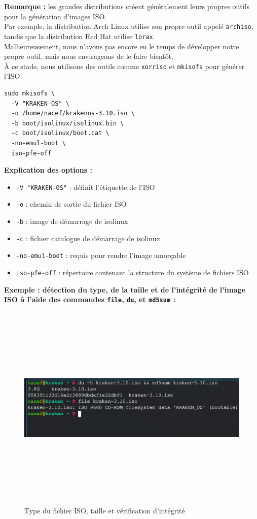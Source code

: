 \textbf{Remarque :} les grandes distributions créent généralement leurs propres outils pour la génération d'images ISO.\\
Par exemple, la distribution Arch Linux utilise son propre outil appelé \texttt{archiso}, tandis que la distribution Red Hat utilise \texttt{lorax}.\\
Malheureusement, nous n'avons pas encore eu le temps de développer notre propre outil, mais nous envisageons de le faire bientôt.\\
À ce stade, nous utilisons des outils comme \texttt{xorriso} et \texttt{mkisofs} pour générer l'ISO.
\begin{verbatim}
sudo mkisofs \
  -V "KRAKEN-OS" \
  -o /home/nacef/krakenos-3.10.iso \
  -b boot/isolinux/isolinux.bin \
  -c boot/isolinux/boot.cat \
  -no-emul-boot \
  iso-pfe-off
\end{verbatim}

\textbf{Explication des options :}
\begin{itemize}
  \item \texttt{-V "KRAKEN-OS"} : définit l'étiquette de l'ISO
  \item \texttt{-o} : chemin de sortie du fichier ISO
  \item \texttt{-b} : image de démarrage de isolinux
  \item \texttt{-c} : fichier catalogue de démarrage de isolinux
  \item \texttt{-no-emul-boot} : requis pour rendre l’image amorçable
  \item \texttt{iso-pfe-off} : répertoire contenant la structure du système de fichiers ISO
\end{itemize}

\medskip

\textbf{Exemple : détection du type, de la taille et de l’intégrité de l’image ISO à l’aide des commandes \texttt{file}, \texttt{du}, et \texttt{md5sum} :}

\begin{figure}[H]
  \centering
  \includegraphics[width=1\textwidth, height=10cm]{images_pfe/fileisoofff.png}
  \caption{Type du fichier ISO, taille et vérification d'intégrité}
  \label{fig:iso_type}
\end{figure}

